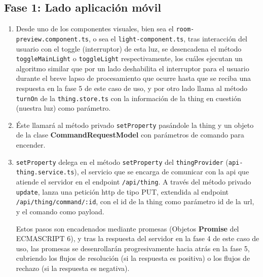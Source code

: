 \subsection{Fase 1: Lado aplicación móvil}
\label{ch:Capitulo5.3.1}
\begin{enumerate}
 \item  Desde uno de los componentes visuales, bien sea el \verb|room-preview.component.ts|, o sea el \verb|light-component.ts|, tras interacción del usuario con el toggle (interruptor) de esta luz, se desencadena el método \verb|toggleMainLight| o \verb|toggleLight| respectivamente, los cuáles ejecutan un algoritmo similar que por un lado deshabilita el interruptor para el usuario durante el breve lapso de procesamiento que ocurre hasta que se reciba una respuesta en la fase 5 de este caso de uso, y por otro lado llama al método \verb|turnOn| de la \verb|thing.store.ts| con la información de la thing en cuestión (nuestra luz) como parámetro.
 
 \item  Éste llamará al método privado \verb|setProperty| pasándole la thing y un objeto de la clase \textbf{CommandRequestModel} con parámetros de comando para encender.
 
 \item  \verb|setProperty| delega en el método \verb|setProperty| del \verb|thingProvider| (\verb|api-thing.service.ts|), el servicio que se encarga de comunicar con la api que atiende el servidor en el endpoint \verb|/api/thing|. A través del método privado \verb|update|, lanza una petición http de tipo PUT, extendida al endpoint \verb|/api/thing/command/:id|, con el id de la thing como parámetro id de la url, y el comando como payload.
 
 Estos pasos son encadenados mediante promesas (Objetos \textbf{Promise} del ECMASCRIPT 6), y tras la respuesta del servidor en la fase 4 de este caso de uso, las promesas se desenrollarán progresivamente hacia atrás en la fase 5, cubriendo los flujos de resolución (si la respuesta es positiva) o los flujos de rechazo (si la respuesta es negativa).
 \end{enumerate}

